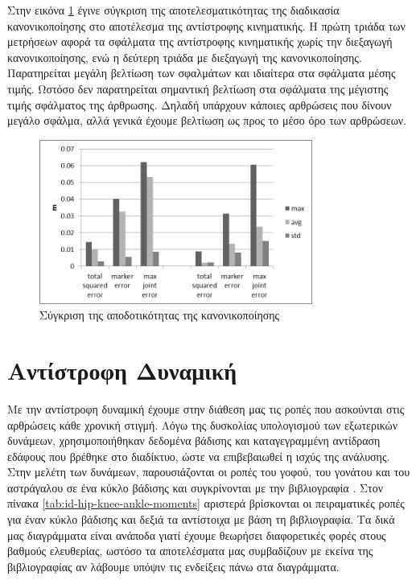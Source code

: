 Στην εικόνα \ref{fig:ik-no-scale-with-scale} έγινε σύγκριση της αποτελεσματικότητας της διαδικασία κανονικοποίησης στο αποτέλεσμα της αντίστροφης κινηματικής. Η πρώτη τριάδα των μετρήσεων αφορά τα σφάλματα της αντίστροφης κινηματικής χωρίς την διεξαγωγή κανονικοποίησης, ενώ η δεύτερη τριάδα με διεξαγωγή της κανονικοποίησης. Παρατηρείται μεγάλη βελτίωση των σφαλμάτων και ιδιαίτερα στα σφάλματα μέσης τιμής. Ωστόσο δεν παρατηρείται σημαντική βελτίωση στα σφάλματα της μέγιστης τιμής σφάλματος της άρθρωσης. Δηλαδή υπάρχουν κάποιες αρθρώσεις που δίνουν μεγάλο σφάλμα, αλλά γενικά έχουμε βελτίωση ως προς το μέσο όρο των αρθρώσεων.

\begin{figure}[H]
    \centering
    \includegraphics[width=0.8\textwidth, keepaspectratio]{fig/ik-no-scale-with-scale.png}
    \caption{Σύγκριση της αποδοτικότητας της κανονικοποίησης}
    \label{fig:ik-no-scale-with-scale}
\end{figure}

\section{Αντίστροφη Δυναμική}

Με την αντίστροφη δυναμική έχουμε στην διάθεση μας τις ροπές που ασκούνται στις αρθρώσεις κάθε χρονική στιγμή. Λόγω της δυσκολίας υπολογισμού των εξωτερικών δυνάμεων, χρησιμοποιήθηκαν δεδομένα βάδισης και καταγεγραμμένη αντίδραση εδάφους που βρέθηκε στο διαδίκτυο, ώστε να επιβεβαιωθεί η ισχύς της ανάλυσης. Στην μελέτη των δυνάμεων, παρουσιάζονται οι ροπές του γοφού, του γονάτου και του αστράγαλου σε ένα κύκλο βάδισης και συγκρίνονται με την βιβλιογραφία \cite{whittlesey}. Στον πίνακα \ref{tab:id-hip-knee-ankle-moments} αριστερά βρίσκονται οι πειραματικές ροπές για έναν κύκλο βάδισης και δεξιά τα αντίστοιχα με βάση τη βιβλιογραφία. Τα δικά μας διαγράμματα είναι ανάποδα γιατί έχουμε θεωρήσει διαφορετικές φορές στους βαθμούς ελευθερίας, ωστόσο τα αποτελέσματα μας συμβαδίζουν με εκείνα της βιβλιογραφίας αν λάβουμε υπόψιν τις ενδείξεις πάνω στα διαγράμματα.

